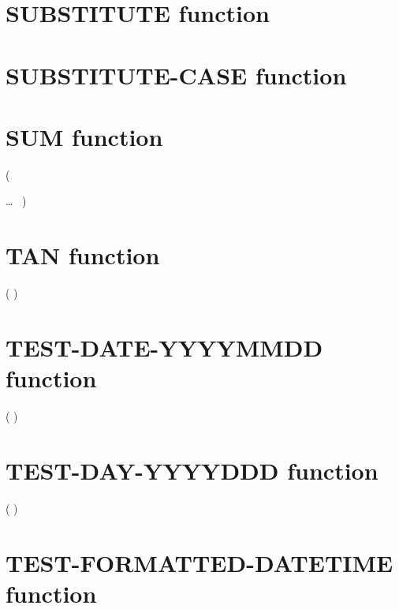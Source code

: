 
\section{SUBSTITUTE function}


\section{SUBSTITUTE-CASE function}


\section{SUM function}

  (
\begin{1=}
  \argument
\end{1=}\ldots
\ {})

\section{TAN function}

  ( \argument )

\section{TEST-DATE-YYYYMMDD function}

  ( \argument )

\section{TEST-DAY-YYYYDDD function}

  ( \argument )

\section{TEST-FORMATTED-DATETIME function}

